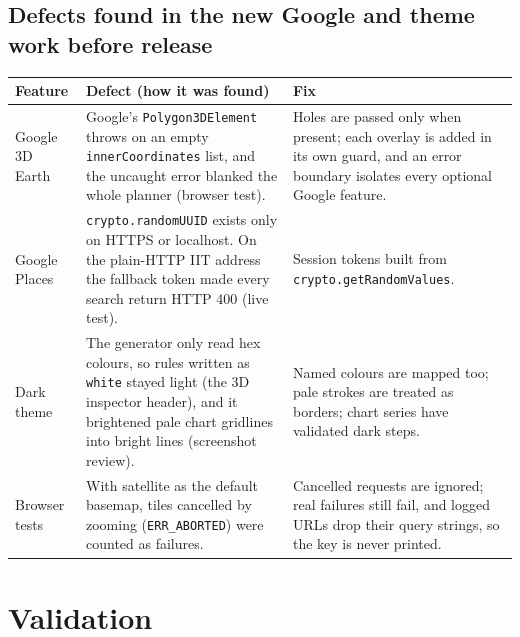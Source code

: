 \documentclass[11pt,a4paper]{article}
\newcommand{\code}[1]{\texttt{#1}}
\begin{document}
\subsection*{Defects found in the new Google and theme work before release}
\begin{tabularx}{\linewidth}{@{}L{34mm}YY@{}}
\toprule
\textbf{Feature} & \textbf{Defect (how it was found)} & \textbf{Fix}\\
\midrule
Google 3D Earth & Google's \code{Polygon3DElement} throws on an empty \code{innerCoordinates} list, and the uncaught error blanked the whole planner (browser test). & Holes are passed only when present; each overlay is added in its own guard, and an error boundary isolates every optional Google feature.\\
Google Places & \code{crypto.randomUUID} exists only on HTTPS or localhost. On the plain-HTTP IIT address the fallback token made every search return HTTP 400 (live test). & Session tokens built from \code{crypto.getRandomValues}.\\
Dark theme & The generator only read hex colours, so rules written as \code{white} stayed light (the 3D inspector header), and it brightened pale chart gridlines into bright lines (screenshot review). & Named colours are mapped too; pale strokes are treated as borders; chart series have validated dark steps.\\
Browser tests & With satellite as the default basemap, tiles cancelled by zooming (\code{ERR\_ABORTED}) were counted as failures. & Cancelled requests are ignored; real failures still fail, and logged URLs drop their query strings, so the key is never printed.\\
\bottomrule
\end{tabularx}

\section{Validation}
\label{sec:validation}
\end{document}
